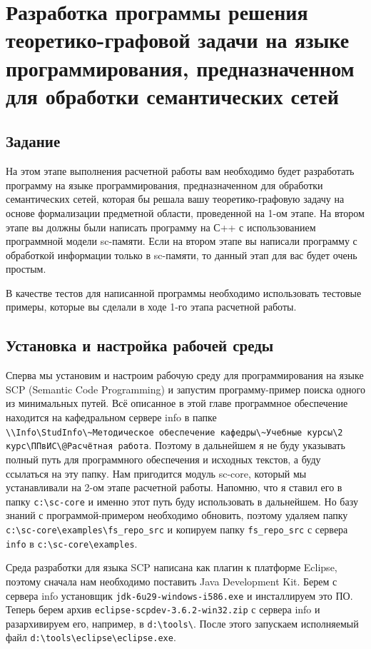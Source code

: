 
\chapter{Разработка программы решения теоретико-графовой задачи на
  языке программирования, предназначенном для обработки семантических
  сетей}
\label{cha:scpalgo}

\section{Задание}

На этом этапе выполнения расчетной работы вам необходимо будет
разработать программу на языке программирования, предназначенном для
обработки семантических сетей, которая бы решала вашу
теоретико-графовую задачу на основе формализации предметной области,
проведенной на 1-ом этапе. На втором этапе вы должны были написать
программу на С++ с использованием программной модели sc-памяти. Если
на втором этапе вы написали программу с обработкой информации только в
sc-памяти, то данный этап для вас будет очень простым.

В качестве тестов для написанной программы необходимо использовать
тестовые примеры, которые вы сделали в ходе 1-го этапа расчетной
работы.

\section{Установка и настройка рабочей среды}

Сперва мы установим и настроим рабочую среду для программирования на
языке SCP (Semantic Code Programming) и запустим программу-пример
поиска одного из минимальных путей. Всё описанное в этой главе
программное обеспечение находится на кафедральном сервере info в папке
\verb|\\Info\StudInfo\~Методическое обеспечение кафедры\~Учебные курсы\2 курс\ППвИС\@Расчётная работа|. Поэтому в дальнейшем я не буду
указывать полный путь для программного обеспечения и исходных текстов,
а буду ссылаться на эту папку. Нам пригодится модуль sc-core, который
мы устанавливали на 2-ом этапе расчетной работы. Напомню, что я ставил
его в папку \verb|c:\sc-core| и именно этот путь буду использовать в
дальнейшем. Но базу знаний с программой-примером необходимо обновить,
поэтому удаляем папку \verb|c:\sc-core\examples\fs_repo_src| и
копируем папку \verb|fs_repo_src| с сервера \verb|info| в
\verb|c:\sc-core\examples|.

Среда разработки для языка SCP написана как плагин к платформе
Eclipse, поэтому сначала нам необходимо поставить Java Development
Kit. Берем с сервера info установщик \verb|jdk-6u29-windows-i586.exe|
и инсталлируем это ПО. Теперь берем архив
\verb|eclipse-scpdev-3.6.2-win32.zip| с сервера info и разархивируем
его, например, в \verb|d:\tools\|. После этого запускаем исполняемый
файл \verb|d:\tools\eclipse\eclipse.exe|.

